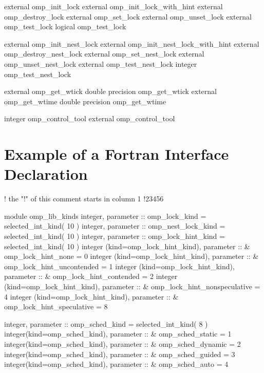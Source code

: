 {{\begin{codepar}
     external omp\_init\_lock
     external omp\_init\_lock\_with\_hint
     external omp\_destroy\_lock
     external omp\_set\_lock
     external omp\_unset\_lock
     external omp\_test\_lock
     logical omp\_test\_lock

     external omp\_init\_nest\_lock
     external omp\_init\_nest\_lock\_with\_hint
     external omp\_destroy\_nest\_lock
     external omp\_set\_nest\_lock
     external omp\_unset\_nest\_lock
     external omp\_test\_nest\_lock
     integer omp\_test\_nest\_lock

     external omp\_get\_wtick
     double precision omp\_get\_wtick
     external omp\_get\_wtime
     double precision omp\_get\_wtime

     integer  omp\_control\_tool
     external omp\_control\_tool
\end{codepar}}





\pagebreak
\section{Example of a Fortran Interface Declaration }
\label{sec:Example of a Fortran Interface Declaration module}
{\small \begin{codepar}
!      the "!" of this comment starts in column 1
!23456

        module omp\_lib\_kinds
        integer, parameter :: omp\_lock\_kind = selected\_int\_kind( 10 )
        integer, parameter :: omp\_nest\_lock\_kind = selected\_int\_kind( 10 )
        integer, parameter :: omp\_lock\_hint\_kind = selected\_int\_kind( 10 )
        integer (kind=omp\_lock\_hint\_kind), parameter :: 
      \&   omp\_lock\_hint\_none = 0
        integer (kind=omp\_lock\_hint\_kind), parameter :: 
      \&   omp\_lock\_hint\_uncontended = 1
        integer (kind=omp\_lock\_hint\_kind), parameter :: 
      \&   omp\_lock\_hint\_contended = 2
        integer (kind=omp\_lock\_hint\_kind), parameter :: 
      \&   omp\_lock\_hint\_nonspeculative = 4 
        integer (kind=omp\_lock\_hint\_kind), parameter :: 
      \&   omp\_lock\_hint\_speculative = 8

        integer, parameter :: omp\_sched\_kind = selected\_int\_kind( 8 ) 
        integer(kind=omp\_sched\_kind), parameter ::
      \&   omp\_sched\_static = 1
        integer(kind=omp\_sched\_kind), parameter ::
      \&   omp\_sched\_dynamic = 2
        integer(kind=omp\_sched\_kind), parameter ::
      \&   omp\_sched\_guided = 3
        integer(kind=omp\_sched\_kind), parameter ::
      \&   omp\_sched\_auto = 4
      

\end{codepar}}}

